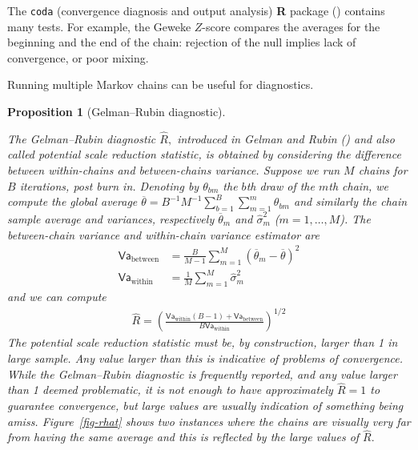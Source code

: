 \documentclass[
  11pt,
  letterpaper,
]{scrbook}
\theoremstyle{plain}
\theoremstyle{plain}
\newtheorem{proposition}{Proposition}[chapter]
\theoremstyle{plain}
\theoremstyle{definition}
\theoremstyle{definition}
\theoremstyle{definition}
\theoremstyle{remark}
\begin{document}
The \texttt{coda} (convergence diagnosis and output analysis) \textbf{R}
package () contains many tests.
For example, the Geweke \(Z\)-score compares the averages for the
beginning and the end of the chain: rejection of the null implies lack
of convergence, or poor mixing.

Running multiple Markov chains can be useful for diagnostics.

\begin{proposition}[Gelman--Rubin
diagnostic]\protect\hypertarget{prp-rhat}{}\label{prp-rhat}

The Gelman--Rubin diagnostic \(\widehat{R},\) introduced in Gelman and
Rubin () and also called potential
scale reduction statistic, is obtained by considering the difference
between within-chains and between-chains variance. Suppose we run \(M\)
chains for \(B\) iterations, post burn in. Denoting by \(\theta_{bm}\)
the \(b\)th draw of the \(m\)th chain, we compute the global average
\(\overline{\theta} = B^{-1}M^{-1}\sum_{b=1}^B \sum_{m=1}^m \theta_{bm}\)
and similarly the chain sample average and variances, respectively
\(\overline{\theta}_m\) and \(\widehat{\sigma}^2_m\)
(\(m=1, \ldots, M\)). The between-chain variance and within-chain
variance estimator are \begin{align*}
\mathsf{Va}_{\text{between}} &= \frac{B}{M-1}\sum_{m=1}^M (\overline{\theta}_m - \overline{\theta})^2\\
\mathsf{Va}_{\text{within}} &= \frac{1}{M}\sum_{m=1}^M \widehat{\sigma}^2_m
\end{align*} and we can compute \begin{align*}
\widehat{R} = \left(\frac{\mathsf{Va}_{\text{within}}(B-1) + \mathsf{Va}_{\text{between}}}{B\mathsf{Va}_{\text{within}}}\right)^{1/2}
\end{align*} The potential scale reduction statistic must be, by
construction, larger than 1 in large sample. Any value larger than this
is indicative of problems of convergence. While the Gelman--Rubin
diagnostic is frequently reported, and any value larger than 1 deemed
problematic, it is not enough to have approximately \(\widehat{R}=1\) to
guarantee convergence, but large values are usually indication of
something being amiss. Figure~\ref{fig-rhat} shows two instances where
the chains are visually very far from having the same average and this
is reflected by the large values of \(\widehat{R}.\)

\end{proposition}
\end{document}
